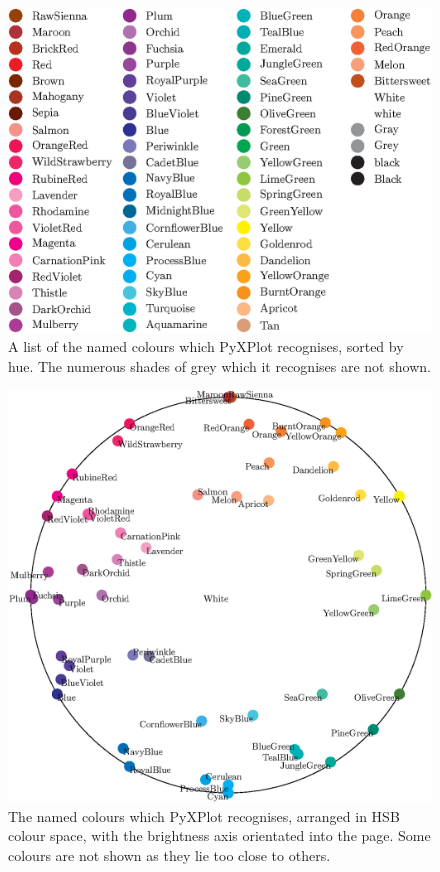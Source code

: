 \begin{figure}
\begin{center}
\includegraphics[width=\textwidth]{figures/pyx_colours3.eps}
\end{center}
\caption[A list of the named colours which PyXPlot recognises, sorted by hue]
{A list of the named colours which PyXPlot recognises, sorted by hue. The numerous shades of grey which it recognises are not shown.}
\label{fig:colour_table2}
\end{figure}

\begin{figure}
\begin{center}
\includegraphics[width=\textwidth]{figures/pyx_colours.eps}
\end{center}
\caption[The named colours which PyXPlot recognises, arranged in HSB colour space]
{The named colours which PyXPlot recognises, arranged in HSB colour space, with the brightness axis orientated into the page. Some colours are not shown as they lie too close to others.}
\label{fig:colour_table3}
\end{figure}

